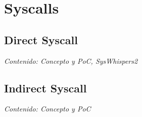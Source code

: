 \section{Syscalls}

\subsection{Direct Syscall}

\textit{Contenido: Concepto y PoC, SysWhispers2}
\vspace{1em}

\subsection{Indirect Syscall}

\textit{Contenido: Concepto y PoC}
\vspace{1em}
